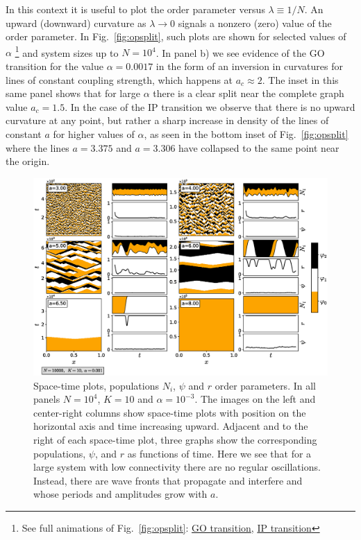 In this context it is useful to plot the order parameter versus $\lambda\equiv1/N$. An upward (downward) curvature as $\lambda \to 0$
signals a nonzero (zero) value of the order parameter. In Fig.~\ref{fig:opsplit}, such plots are shown for selected values of $\alpha$
\footnote{{See full animations of Fig.~\ref{fig:opsplit}:
\href{https://youtu.be/pPQbc0eiv_4}{GO transition}},
\href{https://youtu.be/_qfNzoBpRO4}{IP transition}}
and system sizes up to $N=10^4$.  In panel b) we see evidence of the GO transition for the value $\alpha=0.0017$ in the form of an
inversion in curvatures for lines of constant coupling strength, which happens at $a_c \approx 2$.  The inset in this same panel shows
that for large $\alpha$ there is a clear split near the complete graph value $a_c=1.5$.  In the case of the IP transition we observe
that there is no upward curvature at any point, but rather a sharp increase in density of the lines of constant $a$ for higher values
of $\alpha$, as seen in the bottom inset of Fig.~\ref{fig:opsplit} where the lines $a=3.375$ and $a=3.306$ have collapsed to the same
point near the origin.

\begin{figure}
\begin{center}
    \includegraphics[width=1.\textwidth]{fig/articuno_figure_panel.eps}
\caption{\label{fig:trialpanel} Space-time plots, populations $N_i$, $\psi$ and $r$ order parameters. In all panels $N=10^4$, $K=10$
    and $\alpha=10^{-3}$. The images on the left and center-right columns show space-time plots with position on the horizontal axis
    and time increasing upward.  Adjacent and to the right of each space-time plot, three graphs show the corresponding populations,
    $\psi$, and $r$ as functions of time.  Here we see that for a large system with low connectivity there are no regular oscillations.
Instead, there are wave fronts that propagate and interfere and whose periods and amplitudes grow with $a$.  }
\end{center}
\end{figure}

